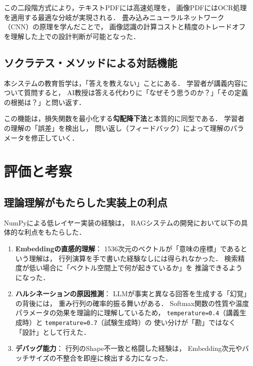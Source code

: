 \documentclass[uplatex, dvipdfmx, a4paper, 11pt]{jsarticle}
\begin{document}
この二段階方式により，テキストPDFには高速処理を，
画像PDFにはOCR処理を適用する最適な分岐が実現される．
畳み込みニューラルネットワーク（CNN）の原理を学んだことで，
画像認識の計算コストと精度のトレードオフを理解した上での設計判断が可能となった．

\subsection{ソクラテス・メソッドによる対話機能}
本システムの教育哲学は，「答えを教えない」ことにある．
学習者が講義内容について質問すると，
AI教授は答える代わりに「なぜそう思うのか？」「その定義の根拠は？」と問い返す．

この機能は，損失関数を最小化する\textbf{勾配降下法}と本質的に同型である．
学習者の理解の「誤差」を検出し，
問い返し（フィードバック）によって理解のパラメータを修正していく．



\section{評価と考察}

\subsection{理論理解がもたらした実装上の利点}
NumPyによる低レイヤー実装の経験は，
RAGシステムの開発において以下の具体的な利点をもたらした．

\begin{enumerate}
    \item \textbf{Embeddingの直感的理解}：
          1536次元のベクトルが「意味の座標」であるという理解は，
          行列演算を手で書いた経験なしには得られなかった．
          検索精度が低い場合に「ベクトル空間上で何が起きているか」を
          推論できるようになった．

    \item \textbf{ハルシネーションの原因推測}：
          LLMが事実と異なる回答を生成する「幻覚」の背後には，
          重み行列の確率的振る舞いがある．
          Softmax関数の性質や温度パラメータの効果を理論的に理解しているため，
          \texttt{temperature=0.4}（講義生成時）と
          \texttt{temperature=0.7}（試験生成時）の
          使い分けが「勘」ではなく「設計」として行えた．

    \item \textbf{デバッグ能力}：
          行列のShape不一致と格闘した経験は，
          Embedding次元やバッチサイズの不整合を即座に検出する力になった．
\end{enumerate}
\end{document}
